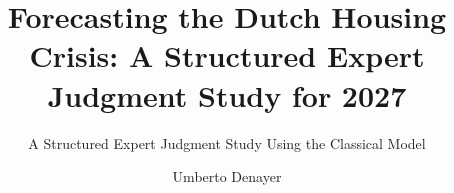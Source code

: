 \documentclass{tudelft-report}
\begin{document}
\frontmatter

\title{Forecasting the Dutch Housing Crisis: A Structured Expert Judgment Study for 2027}

\subtitle{A Structured Expert Judgment Study Using the Classical Model}
\author{Umberto Denayer}

\subject{WI4138: Decision Theory and Expert Judgment}
\makecover







\tableofcontents


\mainmatter





 
 
 

\setcounter{biburlnumpenalty}{7000}
\setcounter{biburllcpenalty}{7000}
\setcounter{biburlucpenalty}{7000}

\sloppy
\printbibliography[heading=bibintoc,title=References]
\fussy


\appendix


\setcounter{chapter}{2} %

\end{document}
